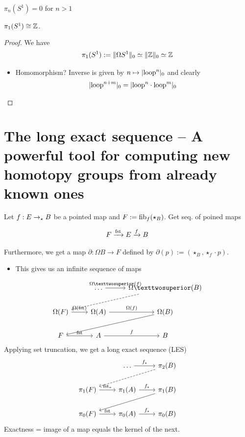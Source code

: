 \documentclass[10pt,oneside,leqno,openright]{memoir}
\begin{document}
\begin{corollary}
  $\pi_n(S^1) = 0$ for $n>1$
\end{corollary}

\begin{corollary}
    $\pi_1(S^1) \cong \mathbb{Z}$.
\end{corollary}
\begin{proof}
    We have
    \[ \pi_1(S^1) := \lVert\Omega S^1\rVert_0 \simeq \lVert\mathbb{Z}\rVert_0 \simeq \mathbb{Z} \]
    \begin{itemize}
    \item Homomorphism? Inverse is given by $n \mapsto \lvert\mathrm{loop}^n\rvert_0$ and clearly
      \[\lvert\mathrm{loop}^{n+m}\rvert_0 = \lvert\mathrm{loop}^{n} \cdot \mathrm{loop}^{m}\rvert_0 \qedhere\]
    \end{itemize}
\end{proof}

\section*{The long exact sequence -- A powerful tool for computing new homotopy groups from already known ones}

Let $f : E \to_\star B$ be a pointed map and $F := \operatorname{fib}_f(\star_B)$. Get seq. of poined maps

\[F \xrightarrow{\operatorname{fst}} E \xrightarrow{f} B \]

Furthermore, we get a map $\partial : \Omega B \to F$ defined by $\partial(p) := (\star_B,\star_f \cdot p)$.
\begin{itemize}
\item This gives us an infinite sequence of maps
\end{itemize}
\[\begin{tikzcd}[ampersand replacement=\&]
	\& \dots \& {\Omega²(B)} \\
	{\Omega(F)} \& {\Omega(A)} \& {\Omega(B)} \\
	F \& A \& B
	\arrow["{\Omega²(f)}", from=1-2, to=1-3]
	\arrow[dashed, from=1-3, to=2-1]
	\arrow["{\Omega(\fst)}", from=2-1, to=2-2]
	\arrow["{\Omega(f)}", from=2-2, to=2-3]
	\arrow[from=2-3, to=3-1]
	\arrow["\fst", from=3-1, to=3-2]
	\arrow["f", from=3-2, to=3-3]
\end{tikzcd}\]
Applying set truncation, we get a long exact sequence (LES)
\[\begin{tikzcd}[ampersand replacement=\&]
	\& \dots \& {\pi_2(B)} \\
	{\pi_1(F)} \& {\pi_1(A)} \& {\pi_1(B)} \\
	{\pi_0(F)} \& {\pi_0(A)} \& {\pi_0(B)}
	\arrow["{f_*}", from=1-2, to=1-3]
	\arrow[dashed, from=1-3, to=2-1]
	\arrow["{\fst_*}", from=2-1, to=2-2]
	\arrow["{f_*}", from=2-2, to=2-3]
	\arrow[from=2-3, to=3-1]
	\arrow["\fst", from=3-1, to=3-2]
	\arrow["{f_*}", from=3-2, to=3-3]
\end{tikzcd}\]
Exactness = image of a map equals the kernel of the next.
\end{document}
